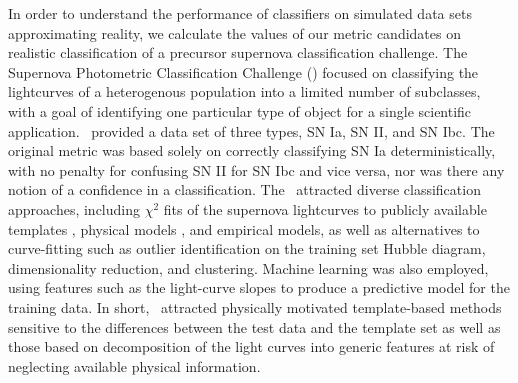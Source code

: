 
In order to understand the performance of classifiers on simulated data sets approximating reality, we calculate the values of our metric candidates on realistic classification of a precursor supernova classification challenge.
The Supernova Photometric Classification Challenge (\snphotcc) \citep{kessler_supernova_2010} focused on classifying the lightcurves of a heterogenous population into a limited number of subclasses, with a goal of identifying one particular type of object for a single scientific application.
\snphotcc\ provided a data set of three types, SN Ia, SN II, and SN Ibc.
The original metric was based solely on correctly classifying SN Ia deterministically, with no penalty for confusing SN II for SN Ibc and vice versa, nor was there any notion of a confidence in a classification.
The \snphotcc\ attracted diverse classification approaches, including $\chi^{2}$ fits of the supernova lightcurves to publicly available templates \citep{nugent_kcorrections_2002}, physical models \citep{conley_sifto:_2008}, and empirical models, as well as alternatives to curve-fitting such as outlier identification on the training set Hubble diagram, dimensionality reduction, and clustering.
Machine learning was also employed, using features such as the light-curve slopes to produce a predictive model for the training data.
In short, \snphotcc\ attracted physically motivated template-based methods sensitive to the differences between the test data and the template set as well as those based on decomposition of the light curves into generic features at risk of neglecting available physical information.
